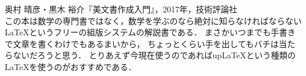 \begin{thebibliography}{99}
  奥村 晴彦・黒木 裕介『{\LaTeXe}美文書作成入門』，2017年，技術評論社 \\
 この本は数学の専門書ではなく，数学を学ぶのなら絶対に知らなければならない
 {\LaTeX}というフリーの組版システムの解説書である．
 まさかいつまでも手書きで文章を書くわけでもあるまいから，
 ちょっとくらい手を出してもバチは当たらないだろうと思う．
 とりあえず今現在使うのであればupLaTeXという種類の
 LaTeXを使うのがおすすめである．
\end{thebibliography}

    
